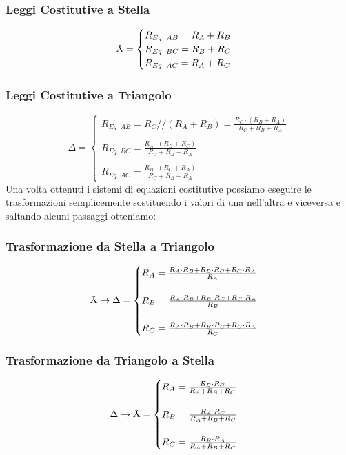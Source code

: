 \documentclass[../main.tex]{subfiles}
\begin{document}
	\subsubsection{Leggi Costitutive a Stella}
	\[
	\rotatebox[origin=c]{180}{Y} =
	\begin{cases}
		R_{Eq \;\; AB} = R_A + R_B \\
		R_{Eq \;\; BC} = R_B + R_C \\
		R_{Eq \;\; AC} = R_A + R_C
	\end{cases}
	\]
	\subsubsection{Leggi Costitutive a Triangolo}
	\[
	\Delta =
	\begin{cases}
		R_{Eq \;\; AB} = R_C // (R_A + R_B)  = \frac{R_C \cdot (R_B + R_A)}{R_C + R_B + R_A}\\\\
		R_{Eq \;\; BC} = \frac{R_A \cdot (R_B + R_C)}{R_C + R_B + R_A} \\\\
		R_{Eq \;\; AC} = \frac{R_B \cdot (R_C + R_A)}{R_C + R_B + R_A}
	\end{cases}
	\]
	Una volta ottenuti i sistemi di equazioni costitutive possiamo eseguire le trasformazioni semplicemente sostituendo i valori di una nell'altra e viceversa e saltando alcuni passaggi otteniamo:
	\subsubsection{Trasformazione da Stella a Triangolo}
	\begin{equation}
		\rotatebox[origin=c]{180}{Y} \rightarrow \Delta =
		\begin{cases}
			R_A = \frac{R_A \cdot R_B + R_B \cdot R_C + R_C \cdot R_A}{R_A} \\\\
			R_B = \frac{R_A \cdot R_B + R_B \cdot R_C + R_C \cdot R_A}{R_B}\\\\
			R_C = \frac{R_A \cdot R_B + R_B \cdot R_C + R_C \cdot R_A}{R_C}
		\end{cases}
	\end{equation}
	\subsubsection{Trasformazione da Triangolo a Stella}
	\begin{equation}
		\Delta \rightarrow \rotatebox[origin=c]{180}{Y} =
		\begin{cases}
			R_A = \frac{R_B \cdot R_C}{R_A + R_B + R_C} \\\\
			R_B = \frac{R_A \cdot R_C}{R_A + R_B + R_C} \\\\
			R_C = \frac{R_B \cdot R_A}{R_A + R_B + R_C}
		\end{cases}
	\end{equation}
\end{document}
